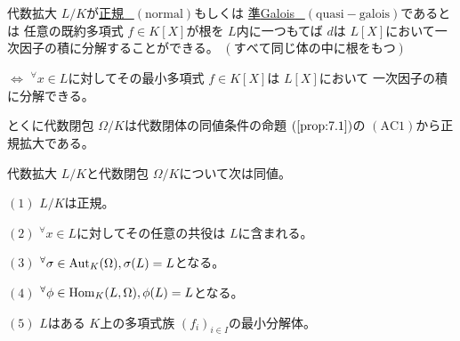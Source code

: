 \documentclass[../master_galois_theory]{subfiles}
\begin{document}
\begin{defi}
  代数拡大 $L/K$が\underline{正規 \  $(\mathrm{normal})$}もしくは
  \underline{準\rm{Galois} \  $(\mathrm{quasi-galois})$}であるとは
  任意の既約多項式 $f \in K[X]$が根を $L$内に一つもてば
  $d$は $L[X]$において一次因子の積に分解することができる。
  $(すべて同じ体の中に根をもつ)$

  $\Leftrightarrow$
  ${}^\forall x \in L$に対してその最小多項式 $f \in K[X]$は $L[X]$において
  一次因子の積に分解できる。

  とくに代数閉包 $\Omega/K$は代数閉体の同値条件の命題 $(\mathrm{\ref{prop:7.1}})$の $(\mathrm{AC}1)$から正規拡大である。
\end{defi}

\begin{prop}
  代数拡大 $L/K$と代数閉包 $\Omega/K$について次は同値。

  $(1)$
  $L/K$は正規。

  $(2)$
  ${}^\forall x \in L$に対してその任意の共役は $L$に含まれる。

  $(3)$
  ${}^\forall \sigma \in \mathrm{Aut}_K(\Omega) , \sigma(L) = L$となる。

  $(4)$
  ${}^\forall \phi \in \mathrm{Hom}_K(L,\Omega) , \phi(L) = L$となる。

  $(5)$
  $L$はある $K$上の多項式族 $(f_i)_{i \in I}$の最小分解体。
\end{prop}
\end{document}
